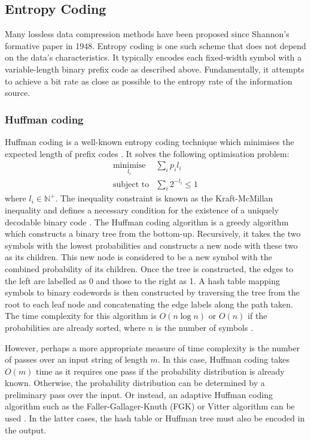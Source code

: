 \subsection{Entropy Coding} \label{sec:data:entropy}

Many lossless data compression methods have been proposed since Shannon's formative paper in 1948. Entropy coding is one such scheme that does not depend on the data's characteristics. It typically encodes each fixed-width symbol with a variable-length binary prefix code as described above. Fundamentally, it attempts to achieve a bit rate as close as possible to the entropy rate of the information source.

\subsubsection{Huffman coding}

Huffman coding is a well-known entropy coding technique which minimises the expected length of prefix codes \cite{huffman}. It solves the following optimisation problem:
\begin{align*}
\underset{l_i}{\text{minimise}}&\sum_i p_il_i\\
\text{subject to}&\sum_i 2^{-l_i}\le 1
\end{align*}
where $l_i\in\mathbb{N}^+$. The inequality constraint is known as the Kraft-McMillan inequality and defines a necessary condition for the existence of a uniquely decodable binary code \cite{mcmillan}. The Huffman coding algorithm is a greedy algorithm which constructs a binary tree from the bottom-up. Recursively, it takes the two symbols with the lowest probabilities and constructs a new node with these two as its children. This new node is considered to be a new symbol with the combined probability of its children. Once the tree is constructed, the edges to the left are labelled as 0 and those to the right as 1. A hash table mapping symbols to binary codewords is then constructed by traversing the tree from the root to each leaf node and concatenating the edge labels along the path taken. The time complexity for this algorithm is $O(n\log n)$ or $O(n)$ if the probabilities are already sorted, where $n$ is the number of symbols \cite{huffman-time}.

However, perhaps a more appropriate measure of time complexity is the number of passes over an input string of length $m$. In this case, Huffman coding takes $O(m)$ time as it requires one pass if the probability distribution is already known. Otherwise, the probability distribution can be determined by a preliminary pass over the input. Or instead, an adaptive Huffman coding algorithm such as the Faller-Gallager-Knuth (FGK) or Vitter algorithm can be used \cite{fgk,vitter}. In the latter cases, the hash table or Huffman tree must also be encoded in the output.

